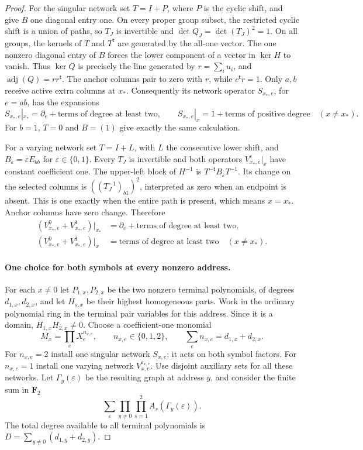 \begin{proof}
For the singular network set $T=I+P$, where $P$ is the cyclic shift,
and give $B$ one diagonal entry one.  On every proper group subset,
the restricted cyclic shift is a union of paths, so $T_J$ is
invertible and $\det Q_J=\det(T_J)^2=1$.  On all groups, the kernels
of $T$ and $T^{\mathsf t}$ are generated by the all-one vector.
The one nonzero diagonal entry of $B$ forces the lower component of
a vector in $\ker H$ to vanish.  Thus $\ker Q$ is precisely the line
generated by $r=\sum_i u_i$, and
$\operatorname{adj}(Q)=rr^{\mathsf t}$.  The anchor columns pair
to zero with $r$, while $c^{\mathsf t}r=1$.  Only $a,b$ receive
active extra columns at $x_*$.  Consequently its network operator
$S_{x_*,e}$, for $e=ab$, has the expansions
\[
 S_{x_*,e}|_{x_*}=\partial_e+\text{terms of degree at least two},
 \qquad
 S_{x_*,e}|_x=1+\text{terms of positive degree}\quad(x\ne x_*).
\]
For $b=1$, $T=0$ and $B=(1)$ give exactly the same calculation.

For a varying network set $T=I+L$, with $L$ the consecutive lower
shift, and $B_\varepsilon=\varepsilon E_{bb}$ for
$\varepsilon\in\{0,1\}$.  Every $T_J$ is invertible and both
operators $V^\varepsilon_{x_*,e}|_x$ have constant coefficient one.
The upper-left block of $H^{-1}$ is
$T^{-\mathsf t}B_\varepsilon T^{-1}$.  Its change on the selected
columns is $((T_J^{-1})_{b1})^2$, interpreted as zero when an endpoint
is absent.  This is one exactly when the entire path is present,
which means $x=x_*$.  Anchor columns have zero change.  Therefore
\[
 \begin{aligned}
 (V^0_{x_*,e}+V^1_{x_*,e})|_{x_*}
       &=\partial_e+\text{terms of degree at least two},\\
 (V^0_{x_*,e}+V^1_{x_*,e})|_x
       &=\text{terms of degree at least two}\quad(x\ne x_*).
 \end{aligned}
\]

\paragraph{One choice for both symbols at every nonzero address.}
For each $x\ne0$ let $P_{1,x},P_{2,x}$ be the two nonzero terminal
polynomials, of degrees $d_{1,x},d_{2,x}$, and let $H_{s,x}$ be their
highest homogeneous parts.  Work in the ordinary polynomial ring
in the terminal pair variables for this address.  Since it is a
domain, $H_{1,x}H_{2,x}\ne0$.  Choose a coefficient-one monomial
\[
 M_x=\prod_e X_e^{n_{x,e}},\qquad n_{x,e}\in\{0,1,2\},\qquad
 \sum_e n_{x,e}=d_{1,x}+d_{2,x}.
\]
For $n_{x,e}=2$ install one singular network $S_{x,e}$; it acts on
both symbol factors.  For $n_{x,e}=1$ install one varying network
$V^{\varepsilon_{x,e}}_{x,e}$.  Use disjoint auxiliary sets for all
these networks.  Let $\Gamma_y(\varepsilon)$ be the resulting graph
at address $y$, and consider the finite sum in $\mathbf F_2$
\[
 \sum_{\varepsilon}
       \prod_{y\ne0}\prod_{s=1}^2 A_s(\Gamma_y(\varepsilon)).
                                                               \tag{G.1a}
\]
The total degree available to all terminal polynomials is
$D=\sum_{y\ne0}(d_{1,y}+d_{2,y})$.


\end{proof}
